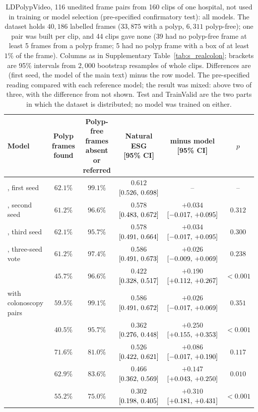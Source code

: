 \begin{table}[!htbp]
\caption{LDPolypVideo, 116 unedited frame pairs from 160 clips of one hospital, not used in training or model selection (pre-specified confirmatory test): all models. The dataset holds $40{,}186$ labelled frames ($33{,}875$ with a polyp, $6{,}311$ polyp-free); one pair was built per clip, and 44 clips gave none (39 had no polyp-free frame at least 5 frames from a polyp frame; 5 had no polyp frame with a box of at least $1\%$ of the frame). Columns as in Supplementary Table~\ref{tab:s_realcolon}; brackets are 95\% intervals from $2{,}000$ bootstrap resamples of whole clips. Differences are \msn{} (first seed, the model of the main text) minus the row model. The pre-specified reading compared \msn{} with each reference model; the result was mixed: above two of three, with the difference from \gem{} not shown. Test and TrainValid are the two parts in which the dataset is distributed; no model was trained on either.}
\label{tab:s_ldpolyp}
\centering
\footnotesize
\begin{adjustbox}{max width=\linewidth}
\begin{tabular}{l cc c cc}
\toprule
Model & \shortstack{Polyp frames\\found} & \shortstack{Polyp-free frames\\absent or referred} & \shortstack{Natural ESG\\{}[95\% CI]} & \shortstack{\msn{} minus model\\{}[95\% CI]} & $p$ \\
\midrule
\msn{}, first seed & $62.1\%$ & $99.1\%$ & $0.612$ $[0.526,\,0.698]$ & -- & -- \\
\msn{}, second seed & $61.2\%$ & $96.6\%$ & $0.578$ $[0.483,\,0.672]$ & $+0.034$ $[-0.017,\,+0.095]$ & $0.312$ \\
\msn{}, third seed & $62.1\%$ & $95.7\%$ & $0.578$ $[0.491,\,0.664]$ & $+0.034$ $[-0.017,\,+0.095]$ & $0.300$ \\
\msn{}, three-seed vote & $61.2\%$ & $97.4\%$ & $0.586$ $[0.491,\,0.673]$ & $+0.026$ $[-0.009,\,+0.069]$ & $0.238$ \\
\ms{} & $45.7\%$ & $96.6\%$ & $0.422$ $[0.328,\,0.517]$ & $+0.190$ $[+0.112,\,+0.267]$ & $<0.001$ \\
\msp{} with colonoscopy pairs & $59.5\%$ & $99.1\%$ & $0.586$ $[0.491,\,0.672]$ & $+0.026$ $[-0.017,\,+0.069]$ & $0.351$ \\
\base{} & $40.5\%$ & $95.7\%$ & $0.362$ $[0.276,\,0.448]$ & $+0.250$ $[+0.155,\,+0.353]$ & $<0.001$ \\
\gem{} & $71.6\%$ & $81.0\%$ & $0.526$ $[0.422,\,0.621]$ & $+0.086$ $[-0.017,\,+0.190]$ & $0.117$ \\
\opus{} & $62.9\%$ & $83.6\%$ & $0.466$ $[0.362,\,0.569]$ & $+0.147$ $[+0.043,\,+0.250]$ & $0.010$ \\
\gpt{} & $55.2\%$ & $75.0\%$ & $0.302$ $[0.198,\,0.405]$ & $+0.310$ $[+0.181,\,+0.431]$ & $<0.001$ \\
\bottomrule
\end{tabular}
\end{adjustbox}


\end{table}
